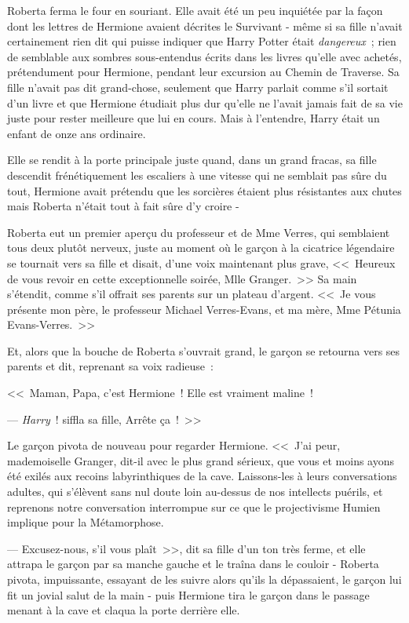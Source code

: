 Roberta ferma le four en souriant. Elle avait été un peu inquiétée par la façon dont les lettres de Hermione avaient décrites le Survivant - même si sa fille n'avait certainement rien dit qui puisse indiquer que Harry Potter était \emph{dangereux}~; rien de semblable aux sombres sous-entendus écrits dans les livres qu'elle avec achetés, prétendument pour Hermione, pendant leur excursion au Chemin de Traverse. Sa fille n'avait pas dit grand-chose, seulement que Harry parlait comme s'il sortait d'un livre et que Hermione étudiait plus dur qu'elle ne l'avait jamais fait de sa vie juste pour rester meilleure que lui en cours. Mais à l'entendre, Harry était un enfant de onze ans ordinaire.

Elle se rendit à la porte principale juste quand, dans un grand fracas, sa fille descendit frénétiquement les escaliers à une vitesse qui ne semblait pas sûre du tout, Hermione avait prétendu que les sorcières étaient plus résistantes aux chutes mais Roberta n'était tout à fait sûre d'y croire -

Roberta eut un premier aperçu du professeur et de Mme Verres, qui semblaient tous deux plutôt nerveux, juste au moment où le garçon à la cicatrice légendaire se tournait vers sa fille et disait, d'une voix maintenant plus grave, <<~Heureux de vous revoir en cette exceptionnelle soirée, Mlle Granger.~>> Sa main s'étendit, comme s'il offrait ses parents sur un plateau d'argent. <<~Je vous présente mon père, le professeur Michael Verres-Evans, et ma mère, Mme Pétunia Evans-Verres.~>>

Et, alors que la bouche de Roberta s'ouvrait grand, le garçon se retourna vers ses parents et dit, reprenant sa voix radieuse~:

<<~Maman, Papa, c'est Hermione~! Elle est vraiment maline~!

--- \emph{Harry}~! siffla sa fille, Arrête ça~!~>>

Le garçon pivota de nouveau pour regarder Hermione. <<~J'ai peur, mademoiselle Granger, dit-il avec le plus grand sérieux, que vous et moins ayons été exilés aux recoins labyrinthiques de la cave. Laissons-les à leurs conversations adultes, qui s'élèvent sans nul doute loin au-dessus de nos intellects puérils, et reprenons notre conversation interrompue sur ce que le projectivisme Humien implique pour la Métamorphose.

--- Excusez-nous, s'il vous plaît~>>, dit sa fille d'un ton très ferme, et elle attrapa le garçon par sa manche gauche et le traîna dans le couloir - Roberta pivota, impuissante, essayant de les suivre alors qu'ils la dépassaient, le garçon lui fit un jovial salut de la main - puis Hermione tira le garçon dans le passage menant à la cave et claqua la porte derrière elle.

